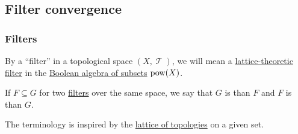 \subsection{Filter convergence}\label{subsec:filter_convergence}

\subsubsection{Filters}

\begin{definition}\label{def:topological_filter}
  By a \enquote{filter} in a topological space \( (X, \mscrT) \), we will mean a \hyperref[def:lattice_ideal/ideal]{lattice-theoretic filter} in the \hyperref[thm:boolean_algebra_of_subsets]{Boolean algebra of subsets} \( \operatorname{pow}(X) \).
\end{definition}

\begin{definition}\label{def:filter_ordering}
  If \( F \subseteq G \) for two \hyperref[def:topological_filter]{filters} over the same space, we say that \( G \) is  than \( F \) and \( F \) is  than \( G \).
\end{definition}
\begin{comments}
  \item The terminology is inspired by the \hyperref[def:topology_ordering]{lattice of topologies} on a given set.
\end{comments}
